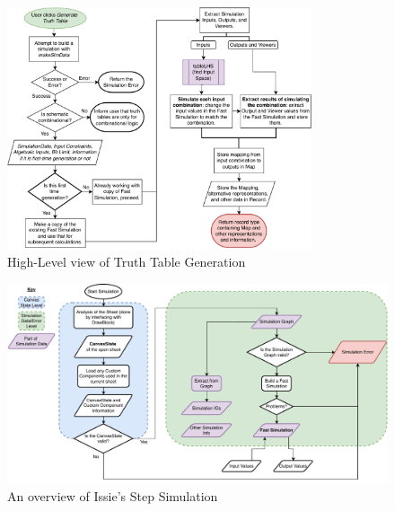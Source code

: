 \begin{figure}[h]
    \centering
    \includegraphics[width=0.8\textwidth]{04.AnalysisDesign/ttGen.pdf}
    \caption{High-Level view of Truth Table Generation}
    \label{fig:ttGen}
\end{figure}

\begin{figure}[h]
    \centering
    \includegraphics[width=\textwidth]{04.AnalysisDesign/IssieSim.pdf}
    \caption{An overview of Issie's Step Simulation}
    \label{fig:flowchartSim}
\end{figure}

